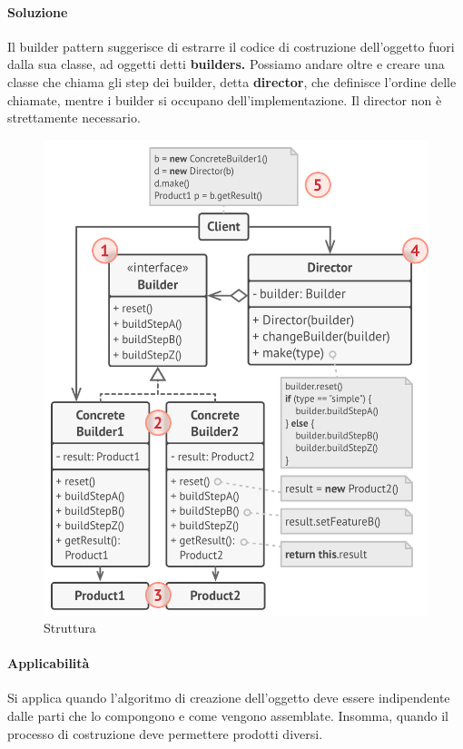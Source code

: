 \documentclass[11pt]{article}
\begin{document}
\paragraph{Soluzione}
Il builder pattern suggerisce di estrarre il codice di costruzione dell'oggetto fuori dalla sua classe, ad oggetti detti \textbf{builders.} Possiamo andare oltre e creare una classe che chiama gli step dei builder, detta \textbf{director}, che definisce l'ordine delle chiamate, mentre i builder si occupano dell'implementazione. 
Il director non è strettamente necessario.
\begin{figure}[H]
    \centering
    \includegraphics[width=\linewidth]{res/teoria/Builder.png}
    \caption{Struttura}
\end{figure}
\paragraph{Applicabilità}
Si applica quando l'algoritmo di creazione dell'oggetto deve essere indipendente dalle parti che lo compongono e come vengono assemblate. Insomma, quando il processo di costruzione deve permettere prodotti diversi.
\end{document}
